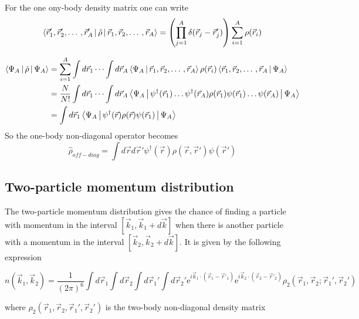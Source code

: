 \documentclass[12pt]{article}
\begin{document}
For the one ony-body density matrix one can write
\begin{align}
\Braket{\vec{r}'_1, \vec{r}'_2, \dotso, \vec{r}'_A|\hat{\rho}|\vec{r}_1, \vec{r}_2, \dotso, \vec{r}_A} = \left( \prod_{j=1}^{A} \delta(\vec{r}_j-\vec{r}_j') \right) \sum_{i=1}^{A} \rho(\vec{r}_i)
\end{align}

\begin{align}
\Braket{\Psi_A|\hat{\rho}|\Psi_A} & = \sum_{i=1}^{A} \int d\vec{r}_1 \cdots \int d\vec{r}_A \Braket{\Psi_A|\vec{r}_1, \vec{r}_2, \dotso, \vec{r}_A}  \rho(\vec{r}_i)\Braket{\vec{r}_1, \vec{r}_2, \dotso, \vec{r}_A|\Psi_A} \\
& = \frac{N}{N!} \int d\vec{r}_1 \cdots \int d\vec{r}_A  \Braket{\Psi_A|\psi^\dagger(\vec{r}_1) \dotso \psi^\dagger(\vec{r}_A) \rho(\vec{r}_1) \psi(\vec{r}_1) \dotso \psi(\vec{r}_A)|\Psi_A } \\
& = \int d\vec{r}_1 \Braket{\Psi_A|\psi^\dagger(\vec{r}) \rho(\vec{r}) \psi(\vec{r}_1)|\Psi_A } 
\end{align}
So the one-body non-diagonal operator becomes
\begin{equation}
\hat{\rho}_{off-diag} = \int d\vec{r} d \vec{r}' \psi^\dagger(\vec{r}) \rho(\vec{r}, \vec{r}') \psi(\vec{r}') 
\end{equation}




\subsection{Two-particle momentum distribution}

The two-particle momentum distribution gives the chance of finding a particle with momentum in the interval $[\vec{k}_1,\vec{k}_1+d\vec{k}]$ when there is another particle with a momentum in the interval $[\vec{k}_2,\vec{k}_2+d\vec{k}]$. It is given by the following expression

\begin{equation}
n(\vec{k}_1,\vec{k}_2)=\frac{1}{(2\pi)^6}\int d\vec{r}_1 \int d\vec{r}_2 \int  
    						d\vec{r}_1' \int d\vec{r}_2' 
    						\mathrm{e}^{i\vec{k}_1\cdot (\vec{r}_1-\vec{r}'_1)} 
    						\mathrm{e}^{i\vec{k}_2\cdot(\vec{r}_2-\vec{r}'_2)}
    						\rho_2(\vec{r}_1,\vec{r}_2; \vec{r}_1',\vec{r}_2')
\end{equation}

where $\rho_2(\vec{r}_1,\vec{r}_2, \vec{r}_1',\vec{r}_2')$ is the two-body non-diagonal density matrix
\end{document}
